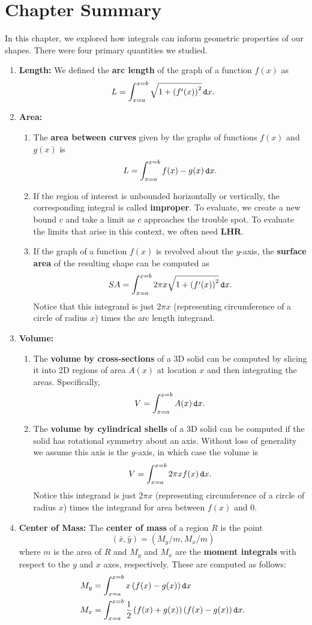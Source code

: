 \section{Chapter Summary}

In this chapter, we explored how integrals can inform geometric properties of our shapes.  There were four primary quantities we studied.

\begin{enumerate}
\item {\bf Length:}  We defined the {\bf arc length} of the graph of a function $f(x)$ as $$ L= \int_{x=a}^{x=b} \sqrt{1+\left( f'(x)\right)^2 } \mathop{}\!\mathtt{d} x. $$
\item {\bf Area:} 
\begin{enumerate}
\item The {\bf area between curves} given by the graphs of functions $f(x)$ and $g(x)$ is $$L= \int_{x=a}^{x=b} f(x)-g(x) \mathop{}\!\mathtt{d} x. $$
\item If the region of interest is unbounded horizontally or vertically, the corresponding integral is called {\bf improper}.  To evaluate, we create a new bound $c$ and take a limit as $c$ approaches the trouble spot.  To evaluate the limits that arise in this context, we often need {\bf LHR}.
\item If the graph of a function $f(x)$ is revolved about the $y$-axis, the {\bf surface area} of the resulting shape can be computed as $$SA= \int_{x=a}^{x=b} 2 \pi x\sqrt{1+\left( f'(x)\right)^2 } \mathop{}\!\mathtt{d} x .$$  Notice that this integrand is just $2\pi x$ (representing circumference of a circle of radius $x$) times the arc length integrand.
\end{enumerate}
 
\item {\bf Volume:} \begin{enumerate}
\item The {\bf volume by cross-sections} of a 3D solid can be computed by slicing it into 2D regions of area $A(x)$ at location $x$ and then integrating the areas. Specifically, $$V=\int_{x=a}^{x=b}A(x)\mathop{}\!\mathtt{d} x. $$
\item The {\bf volume by cylindrical shells} of a 3D solid can be computed if the solid has rotational symmetry about an axis.  Without loss of generality we assume this axis is the $y$-axis, in which case the volume is $$ V= \int_{x=a}^{x=b} 2 \pi x f(x) \mathop{}\!\mathtt{d} x. $$  Notice this integrand is just $2\pi x$ (representing circumference of a circle of radius $x$) times the integrand for area between $f(x)$ and $0$.
\end{enumerate}
\item {\bf Center of Mass:} The {\bf center of mass} of a region $R$ is the point $$\left(\bar{x},\bar{y}\right)=\left(M_y/m,M_x/m\right)$$ where $m$ is the area of $R$ and $M_y$ and $M_x$ are the {\bf moment integrals} with respect to the $y$ and $x$ axes, respectively.  These are computed as follows: \begin{align*}
 M_y&=  \int_{x=a}^{x=b} x\left(f(x)-g(x)\right) \mathop{}\!\mathtt{d} x\\
 M_x&=  \int_{x=a}^{x=b} \frac{1}{2}\left(f(x)+g(x)\right)\left(f(x)-g(x)\right)\mathop{}\!\mathtt{d} x.
\end{align*} 
\end{enumerate}